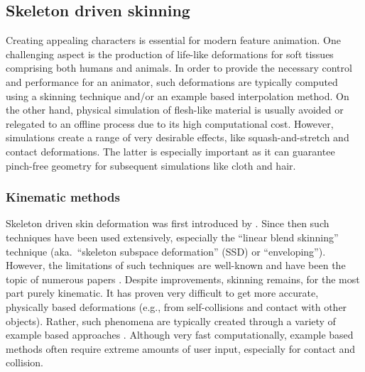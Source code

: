 	\subsection{Skeleton driven skinning}
	Creating appealing characters is essential for modern feature animation. One challenging aspect is the production of life-like deformations for soft tissues comprising both humans and animals. In order to provide the necessary control and performance for an animator, such deformations are typically computed using a skinning technique and/or an example based interpolation method. On the other hand, physical simulation of flesh-like material is usually avoided or relegated to an offline process due to its high computational cost. However, simulations create a range of very desirable effects, like squash-and-stretch and contact deformations. The latter is especially important as it can guarantee pinch-free geometry for subsequent simulations like cloth and hair. 
		\subsubsection{Kinematic methods}
		
Skeleton driven skin deformation was first introduced by \cite{Magnenat-Thalmann89}. Since then such techniques have been used extensively, especially the ``linear blend skinning'' technique (aka.\ ``skeleton subspace deformation'' (SSD) or ``enveloping''). However, the limitations of such techniques are well-known and have been the topic of numerous papers \cite{Wang02,Merry06,Kavan08}. Despite improvements, skinning remains, for the most part purely kinematic. It has proven very difficult to get more accurate, physically based deformations (e.g., from self-collisions and contact with other objects). Rather, such phenomena are typically created through a variety of example based approaches \cite{Lewis00,Sloan01}. Although very fast computationally, example based methods often require extreme amounts of user input, especially for contact and collision.
